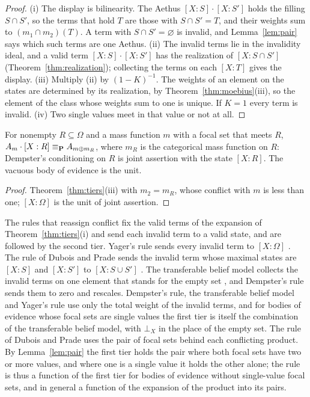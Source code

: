 \begin{proof}
(i) The display is bilinearity. The Aethus $[X:S]\cdot[X:S']$ holds the filling $S \cap S'$, so the terms that hold $T$ are those with $S \cap S' = T$, and their weights sum to $(m_1 \cap m_2)(T)$. A term with $S \cap S' = \varnothing$ is invalid, and Lemma~\ref{lem:pair} says which such terms are one Aethus. (ii) The invalid terms lie in the invalidity ideal, and a valid term $[X:S]\cdot[X:S']$ has the realization of $[X:S \cap S']$ (Theorem~\ref{thm:realization}); collecting the terms on each $[X:T]$ gives the display. (iii) Multiply (ii) by $(1 - K)^{-1}$. The weights of an element on the states are determined by its realization, by Theorem~\ref{thm:moebius}(iii), so the element of the class whose weights sum to one is unique. If $K = 1$ every term is invalid. (iv) Two single values meet in that value or not at all.
\end{proof}

\begin{corollary}\label{cor:cond}
For nonempty $R \subseteq \Omega$ and a mass function $m$ with a focal set that meets $R$, $A_m \cdot [X:R] \equiv_{\mathbf{P}} A_{m \oplus m_R}$, where $m_R$ is the categorical mass function on $R$: Dempster's conditioning on $R$ is joint assertion with the state $[X:R]$. The vacuous body of evidence is the unit.
\end{corollary}

\begin{proof}
Theorem~\ref{thm:tiers}(iii) with $m_2 = m_R$, whose conflict with $m$ is less than one; $[X:\Omega]$ is the unit of joint assertion.
\end{proof}

\begin{remark}\label{rem:reassign}
The rules that reassign conflict fix the valid terms of the expansion of Theorem~\ref{thm:tiers}(i) and send each invalid term to a valid state, and are followed by the second tier. Yager's rule sends every invalid term to $[X:\Omega]$ \cite{yager1987}. The rule of Dubois and Prade sends the invalid term whose maximal states are $[X:S]$ and $[X:S']$ to $[X:S \cup S']$ \cite{dubois1988}. The transferable belief model collects the invalid terms on one element that stands for the empty set \cite{smets1994}, and Dempster's rule sends them to zero and rescales. Dempster's rule, the transferable belief model and Yager's rule use only the total weight of the invalid terms, and for bodies of evidence whose focal sets are single values the first tier is itself the combination of the transferable belief model, with $\bot_X$ in the place of the empty set. The rule of Dubois and Prade uses the pair of focal sets behind each conflicting product. By Lemma~\ref{lem:pair} the first tier holds the pair where both focal sets have two or more values, and where one is a single value it holds the other alone; the rule is thus a function of the first tier for bodies of evidence without single-value focal sets, and in general a function of the expansion of the product into its pairs.
\end{remark}

